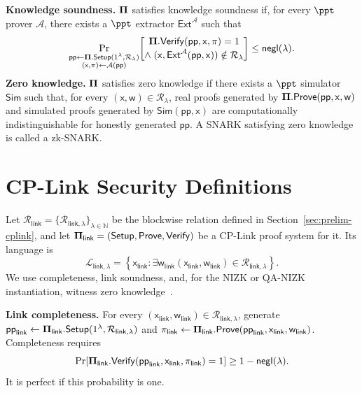 \documentclass[conference,compsoc]{IEEEtran}
\newcommand{\para}{\textsf{pp}}
\newcommand{\bPi}{{\bf \Pi}}
\newcommand{\setup}{{\sf Setup}}
\newcommand{\prove}{{\sf Prove}}
\renewcommand{\verify}{{\sf Verify}}
\newcommand{\relation}{{\mathcal{R}}}
\newcommand{\stmt}{\mathsf{x}}      %
\newcommand{\wit}{\mathsf{w}}       %
\theoremstyle{plain}
\theoremstyle{definition}
\theoremstyle{remark}
\begin{document}
\noindent\textbf{Knowledge soundness.}
\(\bPi\) satisfies knowledge soundness if, for every \(\ppt\) prover
\(\mathcal{A}\), there exists a \(\ppt\) extractor
\(\mathsf{Ext}^{\mathcal{A}}\) such that
\[
\Pr_{\substack{
  \para\gets\bPi.\setup(1^\lambda,\relation_\lambda)\\
  (\stmt,\pi)\gets\mathcal A(\para)}}
\!\left[
\begin{gathered}
  \bPi.\verify(\para,\stmt,\pi)=1\\[-1mm]
  \wedge\;
  (\stmt,\mathsf{Ext}^{\mathcal A}(\para,\stmt))\notin\relation_\lambda
\end{gathered}
\right]
\le\textsf{negl}(\lambda).
\]
\noindent\textbf{Zero knowledge.}
\(\bPi\) satisfies zero knowledge if there exists a \(\ppt\) simulator
\(\mathsf{Sim}\) such that, for every
\((\stmt,\wit)\in\relation_\lambda\), real proofs generated by
\(\bPi.\prove(\para,\stmt,\wit)\) and simulated proofs generated by
\(\mathsf{Sim}(\para,\stmt)\) are computationally indistinguishable for
honestly generated \(\para\).
A SNARK satisfying zero knowledge is called a zk-SNARK.

\section{CP-Link Security Definitions}
\label{app:cplink-security}

Let
\(\relation_{\mathsf{link}}
=\{\relation_{\mathsf{link},\lambda}\}_{\lambda\in\mathbb{N}}\)
be the blockwise relation defined in Section~\ref{sec:prelim-cplink}, and let
\(\bPi_{\mathsf{link}}=(\setup,\prove,\verify)\) be a CP-Link proof system for
it.  Its language is
\[
  \mathcal{L}_{\mathsf{link},\lambda}
  =
  \left\{
    \stmt_{\mathsf{link}}
    :
    \exists \wit_{\mathsf{link}}
    (\stmt_{\mathsf{link}},\wit_{\mathsf{link}})
    \in
    \relation_{\mathsf{link},\lambda}
  \right\}.
\]
We use completeness, link soundness, and, for the NIZK or QA-NIZK
instantiation, witness zero knowledge~\cite{legosnark,qa-nizk}.

\noindent\textbf{Link completeness.}
For every
\((\stmt_{\mathsf{link}},\wit_{\mathsf{link}})
\in\relation_{\mathsf{link},\lambda}\), generate
\(\para_{\mathsf{link}}\gets
\bPi_{\mathsf{link}}.\setup(1^\lambda,\relation_{\mathsf{link},\lambda})\) and
\(\pi_{\mathsf{link}}\gets\bPi_{\mathsf{link}}.\prove(
\para_{\mathsf{link}},\stmt_{\mathsf{link}},\wit_{\mathsf{link}})\).
Completeness requires
\[
\Pr\!\left[
  \bPi_{\mathsf{link}}.\verify(
    \para_{\mathsf{link}},\stmt_{\mathsf{link}},\pi_{\mathsf{link}})=1
\right]
\ge 1-\textsf{negl}(\lambda).
\]
It is perfect if this probability is one.
\end{document}
